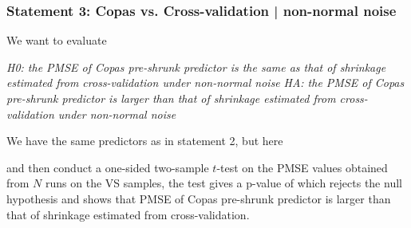 \documentclass{article}
\newcommand{\rinline}[1]{SOMETHING WORNG WITH knitr}
\begin{document}
\subsubsection*{Statement 3: Copas vs. Cross-validation | non-normal noise}
\hspace{12 pt}  We want to evaluate


\hspace{12 pt} \textit{H0: the PMSE of Copas pre-shrunk predictor is
  the same as that of shrinkage estimated from cross-validation under
  non-normal noise} \newline
\vspace{2 pt}
\hspace{24 pt} \textit{HA: the PMSE of Copas pre-shrunk predictor is
  larger than that of shrinkage estimated from cross-validation under
  non-normal noise} \newline


We have the same predictors as in statement 2, but here 





and then conduct a one-sided two-sample $t$-test on the PMSE values obtained
from $N$ runs on the VS samples, the test gives a p-value of 
which rejects the null hypothesis and shows that PMSE of Copas
pre-shrunk predictor is larger than that of shrinkage estimated from cross-validation.


\end{document}
